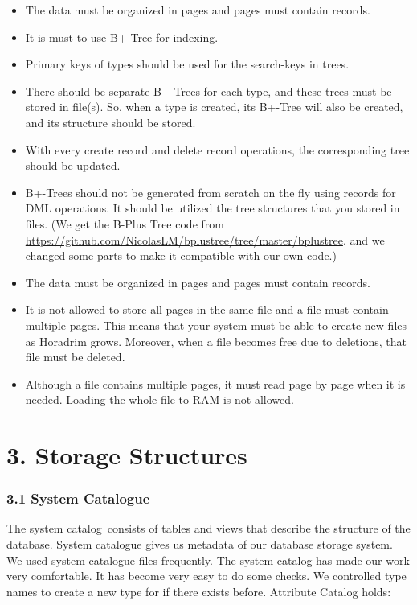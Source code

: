 \documentclass[
]{article}
\begin{document}
\begin{itemize}
\item
  The data must be organized in pages and pages must contain records.
\item
  It is must to use B+-Tree for indexing.
\item
  Primary keys of types should be used for the search-keys in trees.
\item
  There should be separate B+-Trees for each type, and these trees must
  be stored in file(s). So, when a type is created, its B+-Tree will
  also be created, and its structure should be stored.
\item
  With every create record and delete record operations, the
  corresponding tree should be updated.
\item
  B+-Trees should not be generated from scratch on the fly using records
  for DML operations. It should be utilized the tree structures that you
  stored in files. (We get the B-Plus Tree code from
  \url{https://github.com/NicolasLM/bplustree/tree/master/bplustree}.
  and we changed some parts to make it compatible with our own code.)
\item
  The data must be organized in pages and pages must contain records.
\item
  It is not allowed to store all pages in the same file and a file must
  contain multiple pages. This means that your system must be able to
  create new files as Horadrim grows. Moreover, when a file becomes free
  due to deletions, that file must be deleted.
\item
  Although a file contains multiple pages, it must read page by page
  when it is needed. Loading the whole file to RAM is not allowed.
\end{itemize}

  \hypertarget{storage-structures}{%
  \section{3. Storage Structures}\label{storage-structures}}

    \hypertarget{system-catalogue}{%
    \subsubsection{3.1 System Catalogue}\label{system-catalogue}}

The system catalog~consists of tables and views that describe the
structure of the database. System catalogue gives us metadata of our
database storage system. We used system catalogue files frequently. The
system catalog has made our work very comfortable. It has become very
easy to do some checks. We controlled type names to create a new type
for if there exists before. Attribute Catalog holds:
\end{document}
